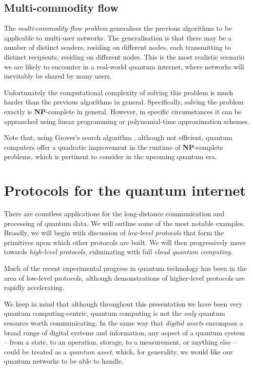 \documentclass[aps,rmp,twocolumn,amsmath,amssymb,nofootinbib,superscriptaddress,longbibliography,floatfix]{revtex4-1}
\begin{document}
%
%

\subsection{Multi-commodity flow} \label{sec:multi_comm_flow}

The \emph{multi-commodity flow problem} \cite{???} generalises the previous algorithms to be applicable to multi-user networks. The generalisation is that there may be a number of distinct senders, residing on different nodes, each transmitting to distinct recipients, residing on different nodes. This is the most realistic scenario we are likely to encounter in a real-world quantum internet, where networks will inevitably be shared by many users.

Unfortunately the computational complexity of solving this problem is much harder than the previous algorithms in general. Specifically, solving the problem exactly is \textbf{NP}-complete in general. However, in specific circumstances it can be approached using linear programming or polynomial-time approximation schemes.

Note that, using Grover's search algorithm \cite{bib:Grover96}, although not efficient, quantum computers offer a quadratic improvement in the runtime of \textbf{NP}-complete problems, which is pertinent to consider in the upcoming quantum era.

%
%

\section{Protocols for the quantum internet}

There are countless applications for the long-distance communication and processing of quantum data. We will outline some of the most notable examples. Broadly, we will begin with discussion of \emph{low-level protocols} that form the primitives upon which other protocols are built. We will then progressively move towards \emph{high-level protocols}, culminating with full \emph{cloud quantum computing}.

Much of the recent experimental progress in quantum technology has been in the area of low-level protocols, although demonstrations of higher-level protocols are rapidly accelerating.

We keep in mind that although throughout this presentation we have been very quantum computing-centric, quantum computing is not the \emph{only} quantum resource worth communicating. In the same way that \emph{digital assets} encompass a broad range of digital systems and information, any aspect of a quantum system -- from a state, to an operation, storage, to a measurement, or anything else -- could be treated as a \emph{quantum asset}, which, for generality, we would like our quantum networks to be able to handle.
\end{document}
